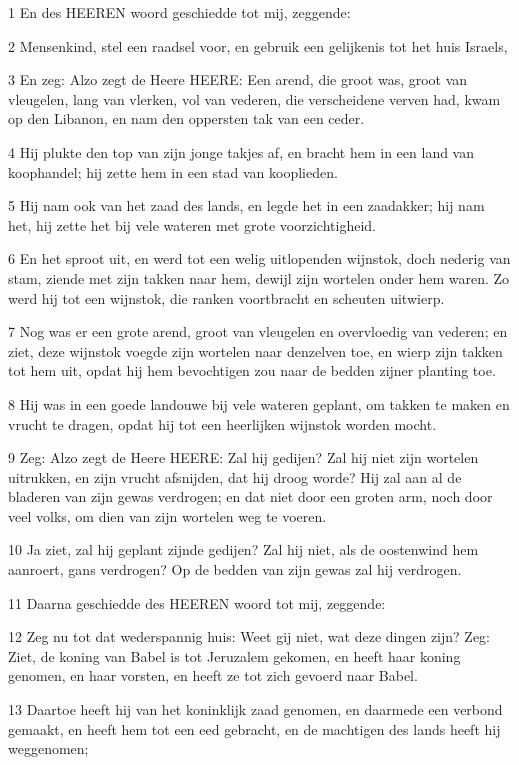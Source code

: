 \par 1 En des HEEREN woord geschiedde tot mij, zeggende:
\par 2 Mensenkind, stel een raadsel voor, en gebruik een gelijkenis tot het huis Israels,
\par 3 En zeg: Alzo zegt de Heere HEERE: Een arend, die groot was, groot van vleugelen, lang van vlerken, vol van vederen, die verscheidene verven had, kwam op den Libanon, en nam den oppersten tak van een ceder.
\par 4 Hij plukte den top van zijn jonge takjes af, en bracht hem in een land van koophandel; hij zette hem in een stad van kooplieden.
\par 5 Hij nam ook van het zaad des lands, en legde het in een zaadakker; hij nam het, hij zette het bij vele wateren met grote voorzichtigheid.
\par 6 En het sproot uit, en werd tot een welig uitlopenden wijnstok, doch nederig van stam, ziende met zijn takken naar hem, dewijl zijn wortelen onder hem waren. Zo werd hij tot een wijnstok, die ranken voortbracht en scheuten uitwierp.
\par 7 Nog was er een grote arend, groot van vleugelen en overvloedig van vederen; en ziet, deze wijnstok voegde zijn wortelen naar denzelven toe, en wierp zijn takken tot hem uit, opdat hij hem bevochtigen zou naar de bedden zijner planting toe.
\par 8 Hij was in een goede landouwe bij vele wateren geplant, om takken te maken en vrucht te dragen, opdat hij tot een heerlijken wijnstok worden mocht.
\par 9 Zeg: Alzo zegt de Heere HEERE: Zal hij gedijen? Zal hij niet zijn wortelen uitrukken, en zijn vrucht afsnijden, dat hij droog worde? Hij zal aan al de bladeren van zijn gewas verdrogen; en dat niet door een groten arm, noch door veel volks, om dien van zijn wortelen weg te voeren.
\par 10 Ja ziet, zal hij geplant zijnde gedijen? Zal hij niet, als de oostenwind hem aanroert, gans verdrogen? Op de bedden van zijn gewas zal hij verdrogen.
\par 11 Daarna geschiedde des HEEREN woord tot mij, zeggende:
\par 12 Zeg nu tot dat wederspannig huis: Weet gij niet, wat deze dingen zijn? Zeg: Ziet, de koning van Babel is tot Jeruzalem gekomen, en heeft haar koning genomen, en haar vorsten, en heeft ze tot zich gevoerd naar Babel.
\par 13 Daartoe heeft hij van het koninklijk zaad genomen, en daarmede een verbond gemaakt, en heeft hem tot een eed gebracht, en de machtigen des lands heeft hij weggenomen;

